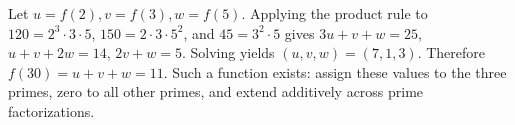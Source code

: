 Let $u=f(2),v=f(3),w=f(5)$. Applying the product rule to $120=2^3\cdot3\cdot5$, $150=2\cdot3\cdot5^2$, and $45=3^2\cdot5$ gives $3u+v+w=25$, $u+v+2w=14$, $2v+w=5$. Solving yields $(u,v,w)=(7,1,3)$. Therefore $f(30)=u+v+w=\boxed{11}$. Such a function exists: assign these values to the three primes, zero to all other primes, and extend additively across prime factorizations.
